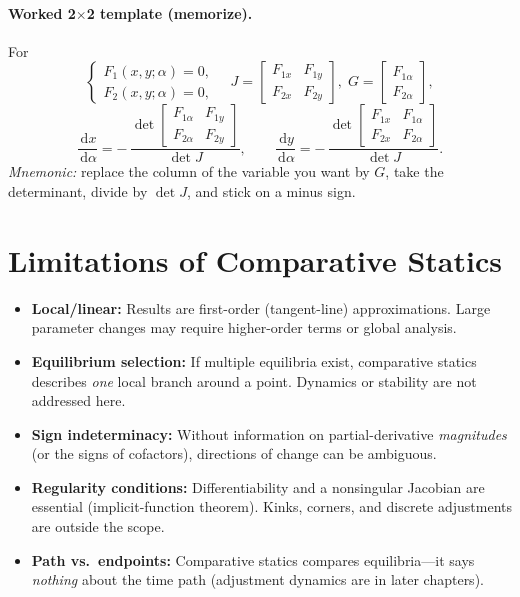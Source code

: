 \documentclass[11pt]{article}
\newcommand{\dd}{\,\mathrm{d}}
\begin{document}
\paragraph{Worked 2$\times$2 template (memorize).}
For
\[
\begin{cases}
F_1(x,y;\alpha)=0,\\
F_2(x,y;\alpha)=0,
\end{cases}
\quad
J=\begin{bmatrix}F_{1x}&F_{1y}\\F_{2x}&F_{2y}\end{bmatrix},\;
G=\begin{bmatrix}F_{1\alpha}\\F_{2\alpha}\end{bmatrix},
\]
\[
\frac{\dd x}{\dd \alpha}
= -\,\frac{\det \begin{bmatrix} F_{1\alpha} & F_{1y}\\ F_{2\alpha} & F_{2y}\end{bmatrix}}{\det J},
\qquad
\frac{\dd y}{\dd \alpha}
= -\,\frac{\det \begin{bmatrix} F_{1x} & F_{1\alpha}\\ F_{2x} & F_{2\alpha}\end{bmatrix}}{\det J}.
\]
\emph{Mnemonic:} replace the column of the variable you want by $G$, take the determinant, divide by $\det J$, and stick on a minus sign.

\section{Limitations of Comparative Statics}
\begin{itemize}
\item \textbf{Local/linear:} Results are first-order (tangent-line) approximations. Large parameter changes may require higher-order terms or global analysis.
\item \textbf{Equilibrium selection:} If multiple equilibria exist, comparative statics describes \emph{one} local branch around a point. Dynamics or stability are not addressed here.
\item \textbf{Sign indeterminacy:} Without information on partial-derivative \emph{magnitudes} (or the signs of cofactors), directions of change can be ambiguous.
\item \textbf{Regularity conditions:} Differentiability and a nonsingular Jacobian are essential (implicit-function theorem). Kinks, corners, and discrete adjustments are outside the scope.
\item \textbf{Path vs.\ endpoints:} Comparative statics compares equilibria---it says \emph{nothing} about the time path (adjustment dynamics are in later chapters).
\end{itemize}
\end{document}
